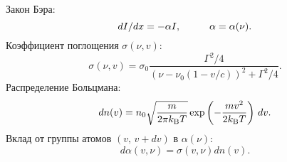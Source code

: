 Закон Бэра:
\begin{equation*}
    d I / d x = - \alpha I,
    \hspace{10 mm} 
    \alpha = \alpha (\nu).
\end{equation*}
Коэффициент поглощения $\sigma(\nu, v)$:
\begin{equation*}
    \label{1_4}
    \sigma(\nu, v) = \sigma_0 \frac{\Gamma^2/4}{(\nu - \nu_0(1 - v / c))^2 + \Gamma^2/4}.
\end{equation*}
Распределение Больцмана:
\begin{equation*}
    d n(v) = n_0 \sqrt{\frac{m}{2 \pi k_{\textnormal{B}} T}} \exp\left(
        - \frac{m v^2}{2 k_{\textnormal{B}} T} 
    \right) \, d v.
\end{equation*} 
Вклад от группы атомов $(v,\, v + d v)$ в $\alpha(\nu)$:
\begin{equation*}
    d \alpha(v, \nu) = \sigma(v, \nu) d n (v).
\end{equation*}


